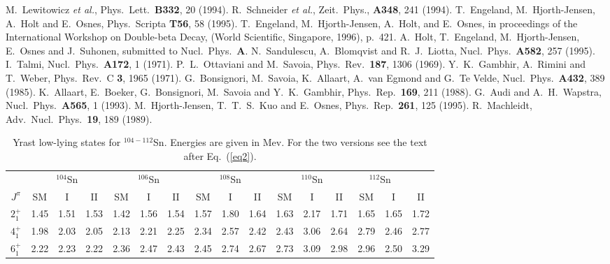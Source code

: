 \begin{references}
M.\ Lewitowicz {\em et al.}, 
Phys.\ Lett.\ {\bf B332}, 20 (1994).
R.\ Schneider {\em et al.}, 
Zeit.\ Phys., {\bf A348}, 241 (1994).
 T.\ Engeland, M.\ Hjorth-Jensen, A.\ Holt and E.\ Osnes, 
 Phys.\ Scripta {\bf T56}, 58 (1995).
 T.\ Engeland, M.\ Hjorth-Jensen, A.\ Holt,
and E.\ Osnes, in proceedings of the International Workshop 
on Double-beta Decay, 
(World Scientific, Singapore, 1996), p.\ 421.
A.\ Holt, T.\ Engeland, 
M.\ Hjorth-Jensen, E.\ Osnes and J.\ Suhonen,
submitted to Nucl.\ Phys.\ {\bf A}.
 N.\ Sandulescu, A.\ Blomqvist and R.\ J.\ Liotta,
Nucl.\ Phys.\ {\bf A582}, 257 (1995).
I.\ Talmi, Nucl.\ Phys.\ {\bf A172}, 1 (1971).
P.\ L.\ Ottaviani and M.\ Savoia, Phys.\ Rev.\
{\bf 187}, 1306 (1969).
Y.\ K.\ Gambhir, A.\ Rimini and T.\ Weber, 
Phys.\ Rev.\ C {\bf 3}, 1965 (1971).
G.\ Bonsignori, M.\ Savoia, K.\ Allaart, 
A.\ van Egmond and
G.\ Te Velde, Nucl.\ Phys.\ {\bf A432}, 389 (1985).
K.\ Allaart, E.\ Boeker, G.\ Bonsignori,
M.\ Savoia and Y.\ K.\ Gambhir, 
Phys.\ Rep.\ {\bf 169}, 211 (1988).
G.\ Audi and A.\ H.\ Wapstra, Nucl.\ Phys.\
{\bf A565}, 1 (1993).
\bibitem{oslo95b} M.\ Hjorth-Jensen, T.\ T.\ S.\ Kuo and 
E.\ Osnes, Phys.\ Rep.\ {\bf 261}, 125 (1995).
\bibitem{mac89} R.\ Machleidt, Adv.\ Nucl.\ Phys.\ {\bf 19}, 189 (1989).

\end{references}





\begin{table}[htbp]
\begin{center}
\caption{Yrast low-lying states for $^{104-112}$Sn. Energies
are given in Mev. For the two versions see the text after Eq.~(\ref{eq2}).}
\begin{tabular}{cccccccccccccccc}
 & \multicolumn{3}{c}{$^{104}$Sn} & \multicolumn{3}{c}{$^{106}$Sn} & 
\multicolumn{3}{c}{$^{108}$Sn} & \multicolumn{3}{c}{$^{110}$Sn} & 
\multicolumn{2}{c}{$^{112}$Sn} \\
 $J^{\pi}$&SM&I&II&SM&I&II&SM&I&II&SM&I&II&SM&I&II \\
\hline
$2^{+}_{1}$ & 1.45 & 1.51 & 1.53 &
                1.42 & 1.56 & 1.54 &
                1.57 & 1.80& 1.64 & 1.63 & 2.17& 1.71 & 1.65 & 1.65& 1.72\\
$4^{+}_{1}$ & 1.98 & 2.03 & 2.05 &
                2.13 & 2.21& 2.25 &
                2.34 &2.57 & 2.42 & 2.43 & 3.06& 2.64& 2.79 & 2.46& 2.77\\
$6^{+}_{1}$ & 2.22 & 2.23 & 2.22 &
              2.36 & 2.47& 2.43 &

                2.45 &2.74 & 2.67  & 2.73 & 3.09& 2.98 & 2.96 & 2.50& 3.29
\end{tabular}
\end{center}
\label{tab-1}
\end{table}





